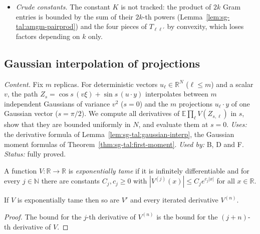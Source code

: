 \begin{remark}
\begin{itemize}
  Gibbs measure (with a vector field $u$ of Gibbs mean zero in Parts~B--D, and with observables $\xi_i$ in Parts~E--F), since only the SK overlap moments of Part~F use the model.  For the SK model $\xi_i(\boldsymbol\sigma)=\sigma_i$.
\item \emph{Crude constants.}  The constant $K$ is not tracked: the product of $2k$ Gram entries is bounded by the sum of their $2k$-th powers
  (Lemma~\ref{lem:sg-tal:amgm-pairprod}) and the four pieces of $T_{\ell\ell'}$ by convexity, which loses factors depending on $k$ only.
\end{itemize}
\end{remark}

\subsection{Gaussian interpolation of projections}
\label{sec:sg-tal:fluct-gauss}

\emph{Content.}  Fix $m$ replicas.  For deterministic vectors $u_\ell\in\mathbb R^N$ ($\ell\le m$) and a scalar $v$, the path
$Z_s=\cos s\,(v\xi)+\sin s\,(u\cdot y)$ interpolates between $m$ independent Gaussians of variance $v^2$ ($s=0$) and the $m$ projections
$u_\ell\cdot y$ of one Gaussian vector ($s=\pi/2$).  We compute all derivatives of $\mathbb E\prod_\ell V(Z_{s,\ell})$ in $s$,
show that they are bounded uniformly in $N$, and evaluate them at $s=0$.
\emph{Uses:} the derivative formula of Lemma~\ref{lem:sg-tal:gaussian-interp}, the Gaussian moment formulas of Theorem~\ref{thm:sg-tal:first-moment}.
\emph{Used by:} B, D and F.  \emph{Status:} fully proved.

\begin{definition}
\label{def:sg-tal:exptame}
  \leanok
{}
A function $V:\mathbb R\to\mathbb R$ is \emph{exponentially tame} if it is infinitely differentiable and for every $j\in\mathbb N$ there are
constants $C_j,c_j\ge0$ with $|V^{(j)}(x)|\le C_je^{c_j|x|}$ for all $x\in\mathbb R$.
\end{definition}

\begin{lemma}
\label{lem:sg-tal:exptame-deriv}
  \leanok
{}
If $V$ is exponentially tame then so are $V'$ and every iterated derivative $V^{(n)}$.
\end{lemma}
\begin{proof}
  \leanok
The bound for the $j$-th derivative of $V^{(n)}$ is the bound for the $(j+n)$-th derivative of $V$.
\end{proof}

